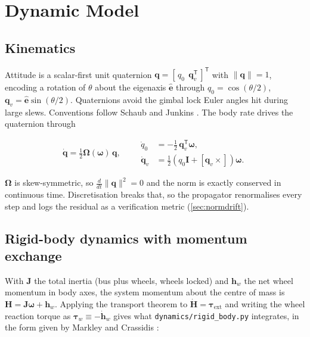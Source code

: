 \documentclass[conference,10pt,a4paper]{IEEEtran}
\newcommand{\vect}[1]{\bm{#1}}
\newcommand{\mat}[1]{\bm{#1}}
\newcommand{\T}{^{\mathsf{T}}}
\newcommand{\skewm}[1]{\left[#1\times\right]}
\begin{document}
\section{Dynamic Model}
\label{sec:model}

\subsection{Kinematics}

Attitude is a scalar-first unit quaternion
$\vect{q} = [\,q_0\ \ \vect{q}_v\T\,]\T$ with $\|\vect{q}\|=1$, encoding a
rotation of $\theta$ about the eigenaxis $\hat{\vect{e}}$ through
$q_0=\cos(\theta/2)$, $\vect{q}_v=\hat{\vect{e}}\sin(\theta/2)$. Quaternions
avoid the gimbal lock Euler angles hit during large slews. Conventions follow
Schaub and Junkins \cite{schaub}. The body rate drives the quaternion through

\begin{equation}
\dot{\vect{q}} = \tfrac{1}{2}\mat{\Omega}(\vect{\omega})\,\vect{q},
\qquad
\begin{aligned}
\dot{q}_0 &= -\tfrac{1}{2}\,\vect{q}_v\T\vect{\omega},\\
\dot{\vect{q}}_v &= \tfrac{1}{2}\!\left(q_0\mat{I}+\skewm{\vect{q}_v}\right)\vect{\omega}.
\end{aligned}
\label{eq:kinematics}
\end{equation}

$\mat{\Omega}$ is skew-symmetric, so $\tfrac{d}{dt}\|\vect{q}\|^2 = 0$ and the
norm is exactly conserved in continuous time. Discretisation breaks that, so
the propagator renormalises every step and logs the residual as a verification
metric (\cref{sec:normdrift}).

\subsection{Rigid-body dynamics with momentum exchange}
\label{sec:dynamics}

With $\mat{J}$ the total inertia (bus plus wheels, wheels locked) and
$\vect{h}_w$ the net wheel momentum in body axes, the system momentum about
the centre of mass is $\vect{H}=\mat{J}\vect{\omega}+\vect{h}_w$. Applying the
transport theorem to $\dot{\vect{H}}=\vect{\tau}_\text{ext}$ and writing the
wheel reaction torque as $\vect{\tau}_w\equiv-\dot{\vect{h}}_w$ gives what
\texttt{dynamics/rigid\_body.py} integrates, in the form given by Markley and
Crassidis \cite{markley}:
\end{document}
